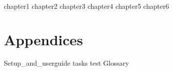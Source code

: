 \documentclass[12pt,a4paper]{report}
\begin{document}
\tableofcontents

{chapter1}
{chapter2}
{chapter3}
{chapter4}
{chapter5}
{chapter6}


\appendix
\chapter{Appendices}
{Setup_and_userguide}
{tasks}
{test}
{Glossary}
\end{document}
